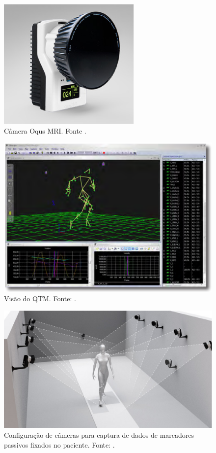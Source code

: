 \begin{figure}[ht]
	\centering
	\includegraphics[width=7cm]{figuras/oqus-mri.eps}
	\caption{Câmera Oqus MRI. Fonte \cite{Qualisys2013}.
}
	\label{oqus_mri}
\end{figure}


\begin{figure}[ht]
	\centering
	\includegraphics[width=15cm]{figuras/qtm.eps}
	\caption{Visão do QTM. Fonte: \cite{Qualisys2010}.}
	\label{visao_qtm}
	
\end{figure}


\begin{figure}[ht]
	\centering
	\includegraphics[width=14cm]{figuras/markers.eps}
	\caption{Configuração de câmeras para captura de dados de marcadores passivos fixados no paciente. Fonte: \cite{Qualisys2013a}.}
	\label{markers}
	
\end{figure}





